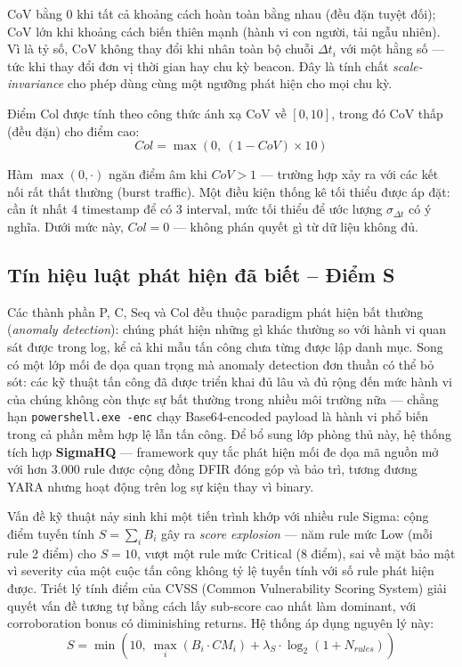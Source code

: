 \documentclass[../main.tex]{subfiles}
\begin{document}
CoV bằng 0 khi tất cả khoảng cách hoàn toàn bằng nhau (đều đặn tuyệt đối); CoV lớn khi khoảng cách biến thiên mạnh (hành vi con người, tải ngẫu nhiên). Vì là tỷ số, CoV không thay đổi khi nhân toàn bộ chuỗi $\Delta t_i$ với một hằng số — tức khi thay đổi đơn vị thời gian hay chu kỳ beacon. Đây là tính chất \textit{scale-invariance} cho phép dùng cùng một ngưỡng phát hiện cho mọi chu kỳ.

Điểm Col được tính theo công thức ánh xạ CoV về $[0, 10]$, trong đó CoV thấp (đều đặn) cho điểm cao:
\begin{equation}
    Col = \max\!\left(0,\ (1 - CoV) \times 10\right) \tag{1.22}
\end{equation}

Hàm $\max(0, \cdot)$ ngăn điểm âm khi $CoV > 1$ — trường hợp xảy ra với các kết nối rất thất thường (burst traffic). Một điều kiện thống kê tối thiểu được áp đặt: cần ít nhất 4 timestamp để có 3 interval, mức tối thiểu để ước lượng $\sigma_{\Delta t}$ có ý nghĩa. Dưới mức này, $Col = 0$ — không phán quyết gì từ dữ liệu không đủ.

\subsection{Tín hiệu luật phát hiện đã biết – Điểm S}
\label{subsection:2.4.6}

Các thành phần P, C, Seq và Col đều thuộc paradigm phát hiện bất thường (\textit{anomaly detection}): chúng phát hiện những gì khác thường so với hành vi quan sát được trong log, kể cả khi mẫu tấn công chưa từng được lập danh mục. Song có một lớp mối đe dọa quan trọng mà anomaly detection đơn thuần có thể bỏ sót: các kỹ thuật tấn công đã được triển khai đủ lâu và đủ rộng đến mức hành vi của chúng không còn thực sự bất thường trong nhiều môi trường nữa — chẳng hạn \texttt{powershell.exe -enc} chạy Base64-encoded payload là hành vi phổ biến trong cả phần mềm hợp lệ lẫn tấn công. Để bổ sung lớp phòng thủ này, hệ thống tích hợp \textbf{SigmaHQ} — framework quy tắc phát hiện mối đe dọa mã nguồn mở với hơn 3.000 rule được cộng đồng DFIR đóng góp và bảo trì, tương đương YARA nhưng hoạt động trên log sự kiện thay vì binary.

Vấn đề kỹ thuật nảy sinh khi một tiến trình khớp với nhiều rule Sigma: cộng điểm tuyến tính $S = \sum_i B_i$ gây ra \textit{score explosion} — năm rule mức Low (mỗi rule 2 điểm) cho $S = 10$, vượt một rule mức Critical (8 điểm), sai về mặt bảo mật vì severity của một cuộc tấn công không tỷ lệ tuyến tính với số rule phát hiện được. Triết lý tính điểm của CVSS (Common Vulnerability Scoring System) giải quyết vấn đề tương tự bằng cách lấy sub-score cao nhất làm dominant, với corroboration bonus có diminishing returns. Hệ thống áp dụng nguyên lý này:
\begin{equation}
    S = \min\!\left(10,\ \max_i\!\left(B_i \cdot CM_i\right) + \lambda_S \cdot \log_2(1 + N_{rules})\right) \tag{1.23}
\end{equation}
\end{document}
